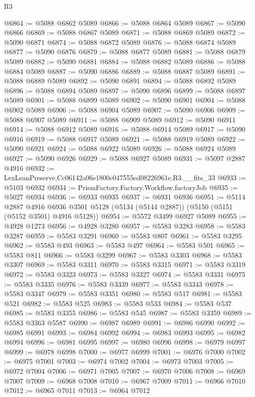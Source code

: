 \begin{lexlean}{R3}
\begin{coremodule}
@6864 := @5088 @6862 @5089
@6866 := @5088 @6864 @5089
@6867 := @5090 @6866
@6869 := @5088 @6867 @5089
@6871 := @5088 @6869 @5089
@6872 := @5090 @6871
@6874 := @5088 @6872 @5089
@6876 := @5088 @6874 @5089
@6877 := @5090 @6876
@6879 := @5088 @6877 @5089
@6881 := @5088 @6879 @5089
@6882 := @5090 @6881
@6884 := @5088 @6882 @5089
@6886 := @5088 @6884 @5089
@6887 := @5090 @6886
@6889 := @5088 @6887 @5089
@6891 := @5088 @6889 @5089
@6892 := @5090 @6891
@6894 := @5088 @6892 @5089
@6896 := @5088 @6894 @5089
@6897 := @5090 @6896
@6899 := @5088 @6897 @5089
@6901 := @5088 @6899 @5089
@6902 := @5090 @6901
@6904 := @5088 @6902 @5089
@6906 := @5088 @6904 @5089
@6907 := @5090 @6906
@6909 := @5088 @6907 @5089
@6911 := @5088 @6909 @5089
@6912 := @5090 @6911
@6914 := @5088 @6912 @5089
@6916 := @5088 @6914 @5089
@6917 := @5090 @6916
@6919 := @5088 @6917 @5089
@6921 := @5088 @6919 @5089
@6922 := @5090 @6921
@6924 := @5088 @6922 @5089
@6926 := @5088 @6924 @5089
@6927 := @5090 @6926
@6929 := @5088 @6927 @5089
@6931 := @5097 @2887 @4916
@6932 := LexLeanPreserve.Cc06142a06e1800c047555ed08226961e.R3.__fits_33
@6933 := @5103 @6932
@6934 := PrismFactory.Factory.Workflow.factoryJob
@6935 := @5027 @6934
@6936 := @6933 @6935
@6937 := @6931 @6936
@6951 := @5114
    @2887
    @4916
    @6936
    @3501
    @5128
    (@5134 (@5144 @2887))
    (@5150 (@5151 (@5152 @3501) @4916 @5128))
@6954 := @5572 @3499 @6927 @5089
@6955 := @4928 @1273
@6956 := @4928 @3280
@6957 := @5583 @3283
@6958 := @5583 @3287
@6959 := @5583 @3291
@6960 := @5583 @807
@6961 := @5583 @3295
@6962 := @5583 @493
@6963 := @5583 @497
@6964 := @5583 @501
@6965 := @5583 @811
@6966 := @5583 @3299
@6967 := @5583 @3303
@6968 := @5583 @3307
@6969 := @5583 @3311
@6970 := @5583 @3315
@6971 := @5583 @3319
@6972 := @5583 @3323
@6973 := @5583 @3327
@6974 := @5583 @3331
@6975 := @5583 @3335
@6976 := @5583 @3339
@6977 := @5583 @3343
@6978 := @5583 @3347
@6979 := @5583 @3351
@6980 := @5583 @517
@6981 := @5583 @521
@6982 := @5583 @525
@6983 := @5583 @533
@6984 := @5583 @537
@6985 := @5583 @3355
@6986 := @5583 @545
@6987 := @5583 @3359
@6989 := @5583 @3363 @5587
@6990 := @6987 @6989
@6991 := @6986 @6990
@6992 := @6985 @6991
@6993 := @6984 @6992
@6994 := @6983 @6993
@6995 := @6982 @6994
@6996 := @6981 @6995
@6997 := @6980 @6996
@6998 := @6979 @6997
@6999 := @6978 @6998
@7000 := @6977 @6999
@7001 := @6976 @7000
@7002 := @6975 @7001
@7003 := @6974 @7002
@7004 := @6973 @7003
@7005 := @6972 @7004
@7006 := @6971 @7005
@7007 := @6970 @7006
@7008 := @6969 @7007
@7009 := @6968 @7008
@7010 := @6967 @7009
@7011 := @6966 @7010
@7012 := @6965 @7011
@7013 := @6964 @7012

\end{coremodule}
\end{lexlean}
